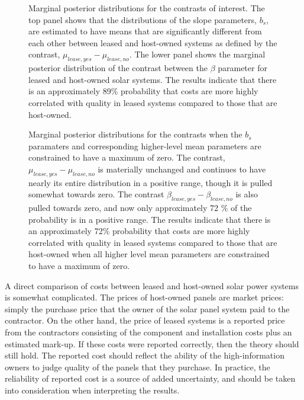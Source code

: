 \documentclass[a4paper]{article}
\begin{document}
\begin{figure}
\begin{minipage}{.48\textwidth}
  \label{fig:contrasts_const}
 \end{minipage}
\bigskip
\begin{minipage}[t]{.48\textwidth}
\centering
\caption{Marginal posterior distributions for the contrasts of interest. The top panel shows that the distributions of the slope parameters, $b_s$, are estimated to have means that are significantly different from each other between leased and host-owned systems as defined by the contrast, $\mu_{lease, yes} - \mu_{lease, no}$. The lower panel shows the marginal posterior distribution of the contrast between the $\beta$ parameter for leased and host-owned solar systems. The results indicate that there is an approximately 89\% probability that costs are more highly correlated with quality in leased systems compared to those that are host-owned.}
\end{minipage}\qquad
\begin{minipage}[t]{.48\textwidth}
\centering
 \caption{Marginal posterior distributions for the contrasts when the $b_s$ paramaters and corresponding higher-level mean parameters are constrained to have a maximum of zero. The contrast, $\mu_{lease, yes} - \mu_{lease, no}$ is materially unchanged and continues to have nearly its entire distribution in a positive range, though it is pulled somewhat towards zero. The contrast $\beta_{lease, yes} - \beta_{lease, no}$ is also pulled towards zero, and now only approximately 72 \% of the probability is in a positive range. The results indicate that there is an approximately 72\% probability that costs are more highly correlated with quality in leased systems compared to those that are host-owned when all higher level mean parameters are constrained to have a maximum of zero.}
\end{minipage}
\end{figure}

A direct comparison of costs between leased and host-owned solar power systems is somewhat complicated. The prices of host-owned panels are market prices: simply the purchase price that the owner of the solar panel system paid to the contractor. On the other hand, the price of leased systems is a reported price from the contractors consisting of the component and installation costs plus an estimated mark-up. If these costs were reported correctly, then the theory should still hold. The reported cost should reflect the ability of the high-information owners to judge quality of the panels that they purchase. In practice, the reliability of reported cost is a source of added uncertainty, and should be taken into consideration when interpreting the results.
\end{document}
